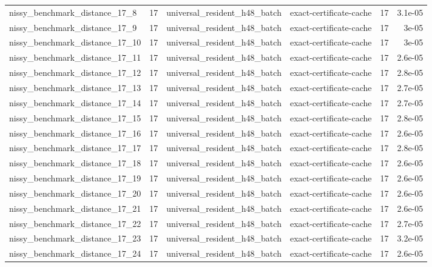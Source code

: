 {\begin{tabular}{lrllrr}
nissy\_benchmark\_distance\_17\_8 & 17 & universal\_resident\_h48\_batch & exact-certificate-cache & 17 & 3.1e-05 \\
nissy\_benchmark\_distance\_17\_9 & 17 & universal\_resident\_h48\_batch & exact-certificate-cache & 17 & 3e-05 \\
nissy\_benchmark\_distance\_17\_10 & 17 & universal\_resident\_h48\_batch & exact-certificate-cache & 17 & 3e-05 \\
nissy\_benchmark\_distance\_17\_11 & 17 & universal\_resident\_h48\_batch & exact-certificate-cache & 17 & 2.6e-05 \\
nissy\_benchmark\_distance\_17\_12 & 17 & universal\_resident\_h48\_batch & exact-certificate-cache & 17 & 2.8e-05 \\
nissy\_benchmark\_distance\_17\_13 & 17 & universal\_resident\_h48\_batch & exact-certificate-cache & 17 & 2.7e-05 \\
nissy\_benchmark\_distance\_17\_14 & 17 & universal\_resident\_h48\_batch & exact-certificate-cache & 17 & 2.7e-05 \\
nissy\_benchmark\_distance\_17\_15 & 17 & universal\_resident\_h48\_batch & exact-certificate-cache & 17 & 2.8e-05 \\
nissy\_benchmark\_distance\_17\_16 & 17 & universal\_resident\_h48\_batch & exact-certificate-cache & 17 & 2.6e-05 \\
nissy\_benchmark\_distance\_17\_17 & 17 & universal\_resident\_h48\_batch & exact-certificate-cache & 17 & 2.8e-05 \\
nissy\_benchmark\_distance\_17\_18 & 17 & universal\_resident\_h48\_batch & exact-certificate-cache & 17 & 2.6e-05 \\
nissy\_benchmark\_distance\_17\_19 & 17 & universal\_resident\_h48\_batch & exact-certificate-cache & 17 & 2.6e-05 \\
nissy\_benchmark\_distance\_17\_20 & 17 & universal\_resident\_h48\_batch & exact-certificate-cache & 17 & 2.6e-05 \\
nissy\_benchmark\_distance\_17\_21 & 17 & universal\_resident\_h48\_batch & exact-certificate-cache & 17 & 2.6e-05 \\
nissy\_benchmark\_distance\_17\_22 & 17 & universal\_resident\_h48\_batch & exact-certificate-cache & 17 & 2.7e-05 \\
nissy\_benchmark\_distance\_17\_23 & 17 & universal\_resident\_h48\_batch & exact-certificate-cache & 17 & 3.2e-05 \\
nissy\_benchmark\_distance\_17\_24 & 17 & universal\_resident\_h48\_batch & exact-certificate-cache & 17 & 2.6e-05 \\

\end{tabular}}
